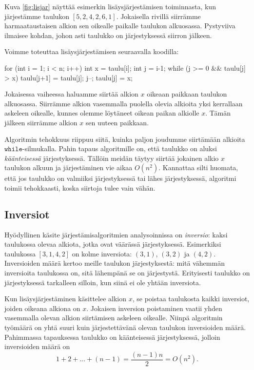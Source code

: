 Kuva \ref{fig:lisjar} näyttää esimerkin lisäysjärjestämisen
toiminnasta, kun järjes\-tämme taulukon $[5,2,4,2,6,1]$.
Jokaisella rivillä siirrämme harmaataustaisen alkion
sen oikealle paikalle taulukon alkuosassa.
Pystyviiva ilmaisee kohdan, johon asti taulukko on järjestyksessä
siirron jälkeen.

Voimme toteuttaa lisäysjärjestämisen seuraavalla koodilla:

\begin{code}
for (int i = 1; i < n; i++) {
    int x = taulu[i];
    int j = i-1;
    while (j >= 0 && taulu[j] > x) {
        taulu[j+1] = taulu[j];
        j--;
    }
    taulu[j] = x;
}
\end{code}

Jokaisessa vaiheessa haluamme siirtää alkion $x$
oikeaan paikkaan taulukon alkuosassa.
Siirrämme alkion vasemmalla puolella olevia alkioita
yksi kerrallaan askeleen oikealle, kunnes olemme löytäneet
oikean paikan alkiolle $x$. Tämän jälkeen siirrämme
alkion $x$ sen uuteen paikkaan.

Algoritmin tehokkuus riippuu siitä, kuinka paljon
joudumme siirtämään alkioita $\texttt{while}$-silmukalla.
Pahin tapaus algoritmille on, että taulukko on aluksi
\emph{käänteisessä} järjestyksessä.
Tällöin meidän täytyy siirtää jokainen alkio $x$
taulukon alkuun ja järjestäminen vie aikaa $O(n^2)$.
Kannattaa silti huomata, että jos taulukko on valmiiksi
järjestyksessä tai lähes järjestyksessä,
algoritmi toimii tehokkaasti, koska siirtoja tulee vain vähän.

\subsection{Inversiot}

Hyödyllinen käsite järjestämisalgoritmien analysoinnissa
on \emph{inversio}: kaksi taulukossa olevaa alkiota,
jotka ovat väärässä järjestyksessä.
Esimerkiksi taulukossa $[3,1,4,2]$ on kolme inversiota:
$(3,1)$, $(3,2)$ ja $(4,2)$.
Inversioiden määrä kertoo meille taulukon järjestyksestä:
mitä vähemmän inversioita taulukossa on,
sitä lähempänä se on järjestystä.
Erityisesti taulukko on järjestyksessä tarkalleen silloin,
kun siinä ei ole yhtään inversiota.

Kun lisäysjärjestäminen käsittelee alkion $x$,
se poistaa taulukosta kaikki inversiot,
joiden oikeana alkiona on $x$.
Jokaisen inversion poistaminen vaatii yhden
vasemmalla olevan alkion siirtämisen askeleen oikealle.
Niinpä algoritmin työmäärä on yhtä suuri kuin
järjestettävänä olevan taulukon inversioiden määrä.
Pahimmassa tapauksessa taulukko on käänteisessä
järjestyksessä, jolloin inversioiden määrä on
\[1+2+\dots+(n-1)=\frac{(n-1)n}{2}=O(n^2).\]

